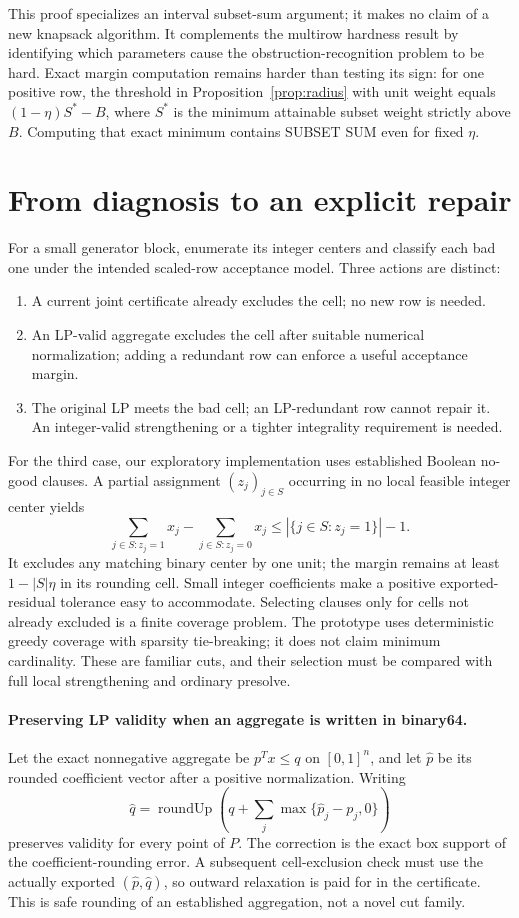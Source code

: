 \documentclass[11pt]{article}
\begin{document}
This proof specializes an interval subset-sum argument; it makes no claim of a
new knapsack algorithm. It complements the multirow hardness result by identifying
which parameters cause the obstruction-recognition problem to be hard. Exact
margin computation remains harder than testing its sign: for one positive row,
the threshold in Proposition~\ref{prop:radius} with unit weight equals
$(1-\eta)S^*-B$, where $S^*$ is the minimum attainable subset weight strictly
above $B$. Computing that exact minimum contains SUBSET SUM even for fixed $\eta$.

\section{From diagnosis to an explicit repair}
For a small generator block, enumerate its integer centers and classify each bad
one under the intended scaled-row acceptance model. Three actions are distinct:
\begin{enumerate}
\item A current joint certificate already excludes the cell; no new row is needed.
\item An LP-valid aggregate excludes the cell after suitable numerical normalization;
      adding a redundant row can enforce a useful acceptance margin.
\item The original LP meets the bad cell; an LP-redundant row cannot repair it.
      An integer-valid strengthening or a tighter integrality requirement is needed.
\end{enumerate}
For the third case, our exploratory implementation uses established Boolean no-good
clauses. A partial assignment $(z_j)_{j\in S}$ occurring in no local feasible integer
center yields
\[
 \sum_{j\in S:z_j=1}x_j-\sum_{j\in S:z_j=0}x_j
 \le |\{j\in S:z_j=1\}|-1.
\]
It excludes any matching binary center by one unit; the margin remains at least
$1-|S|\eta$ in its rounding cell. Small integer coefficients make a positive
exported-residual tolerance easy to accommodate. Selecting clauses only for cells
not already excluded is a finite coverage problem. The prototype uses deterministic
greedy coverage with sparsity tie-breaking; it does not claim minimum cardinality.
These are familiar cuts, and their selection must be compared with full local
strengthening and ordinary presolve.

\paragraph{Preserving LP validity when an aggregate is written in binary64.}
Let the exact nonnegative aggregate be $p^Tx\le q$ on $[0,1]^n$, and let
$\widehat p$ be its rounded coefficient vector after a positive normalization.
Writing
\[
 \widehat q=\operatorname{roundUp}\left(q+
        \sum_j\max\{\widehat p_j-p_j,0\}\right)
\]
preserves validity for every point of $P$. The correction is the exact box support
of the coefficient-rounding error. A subsequent cell-exclusion check must use the
actually exported $(\widehat p,\widehat q)$, so outward relaxation is paid for in the
certificate. This is safe rounding of an established aggregation, not a novel cut family.
\end{document}
